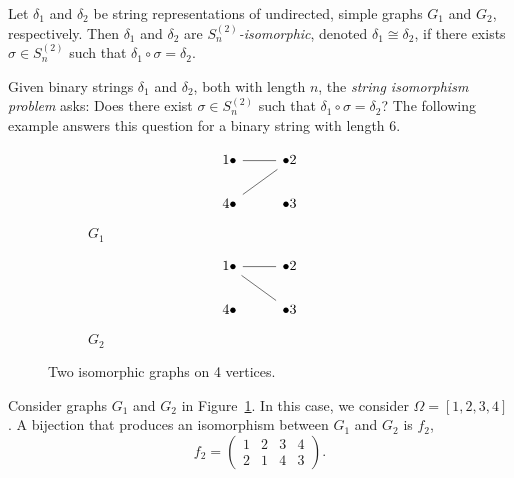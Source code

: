 \begin{definition}\label{def:def225}
Let $\delta_1$ and $\delta_2$ be string representations of undirected, simple graphs $G_1$ and $G_2$, respectively. Then $\delta_1$ and $\delta_2$ are $S_n^{(2)}$\textit{-isomorphic}, denoted $\delta_1\cong \delta_2$, if there exists $\sigma\in S_n^{(2)}$ such that $\delta_1\circ\sigma=\delta_2$.
\end{definition}
Given binary strings $\delta_1$ and $\delta_2$, both with length $n$, the \textit{string isomorphism problem} asks: Does there exist $\sigma\in S_n^{(2)}$ such that $\delta_1\circ\sigma=\delta_2$? The following example answers this question for a binary string with length 6.
\begin{example}\label{ex:ex221}
\begin{figure}[H]
\begin{subfigure}{.5\textwidth}
\[\begin{tikzcd}
	1\bullet & {\bullet 2} \\
	4\bullet & {\bullet 3}
	\arrow[no head, from=1-1, to=1-2]
	\arrow[no head, from=1-2, to=2-1]
\end{tikzcd}\]
\caption{$G_1$}
\end{subfigure}
\begin{subfigure}{.5\textwidth}
\[\begin{tikzcd}
	1\bullet & {\bullet 2} \\
	4\bullet & {\bullet 3}
	\arrow[no head, from=1-1, to=1-2]
	\arrow[no head, from=1-1, to=2-2]
\end{tikzcd}\]
\caption{$G_2$}
\end{subfigure}
\caption{Two isomorphic graphs on 4 vertices.}\label{fig:fig32}
\end{figure}
Consider graphs $G_1$ and $G_2$ in Figure~\ref{fig:fig32}. In this case, we consider $\Omega=[1,2,3,4]$. A bijection that produces an isomorphism between $G_1$ and $G_2$ is $f_2$,
\[f_2=\begin{pmatrix}1&2&3&4\\
2&1&4&3
\end{pmatrix}.\]

\end{example}
